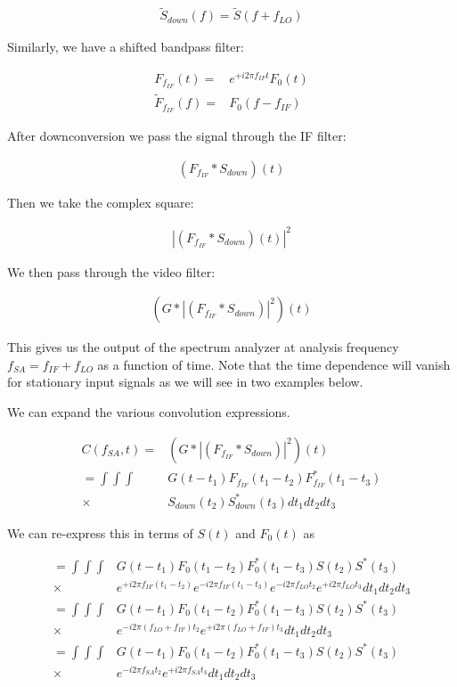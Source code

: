 \documentclass[12pt]{article}
\begin{document}
\begin{align}
\tilde{S}_{down}(f) = \tilde{S}(f + f_{LO})
\end{align}

Similarly, we have a shifted bandpass filter:

\begin{align}
F_{f_{IF}}(t) =& e^{+i2\pi f_{IF} t} F_0(t)\\
\tilde{F}_{f_{IF}}(f) =& F_0(f-f_{IF})
\end{align}

After downconversion we pass the signal through the IF filter:

\begin{align}
\left(F_{f_{IF}} \ast S_{down}\right)(t)
\end{align}

Then we take the complex square:

\begin{align}
\left|\left(F_{f_{IF}} \ast S_{down}\right)(t)\right|^2
\end{align}

We then pass through the video filter:

\begin{align}
\left(G \ast \left|\left(F_{f_{IF}} \ast S_{down}\right)\right|^2\right)(t)
\end{align}

This gives us the output of the spectrum analyzer at analysis frequency $f_{SA} = f_{IF} + f_{LO}$ as a function of time.
Note that the time dependence will vanish for stationary input signals as we will see in two examples below.

We can expand the various convolution expressions.

\begin{align}
C(f_{SA}, t) =& \left(G \ast \left|\left(F_{f_{IF}} \ast S_{down}\right)\right|^2\right)(t)\\
= \int \int \int &G(t-t_1) F_{f_{IF}}(t_1-t_2)F^*_{f_{IF}}(t_1-t_3)\\
\times& S_{down}(t_2)S_{down}^*(t_3) dt_1 dt_2 dt_3
\end{align}

We can re-express this in terms of $S(t)$ and $F_0(t)$ as

\begin{align}
=\int \int \int &G(t-t_1)F_0(t_1-t_2)F_0^*(t_1-t_3)S(t_2)S^*(t_3)\\
\times& e^{+i2\pi f_{IF}(t_1 - t_2)} e^{-i2\pi f_{IF}(t_1-t_3)} e^{-i2\pi f_{LO}t_2}e^{+i2\pi f_{LO}t_3} dt_1dt_2dt_3\\
=\int \int \int &G(t-t_1)F_0(t_1-t_2)F_0^*(t_1-t_3)S(t_2)S^*(t_3)\\
\times& e^{-i2\pi (f_{LO}+f_{IF})t_2} e^{+i2\pi (f_{LO}+f_{IF})t_3} dt_1 dt_2 dt_3\\
=\int \int \int &G(t-t_1)F_0(t_1-t_2)F_0^*(t_1-t_3)S(t_2)S^*(t_3)\\
\times& e^{-i2\pi f_{SA} t_2} e^{+i2\pi f_{SA}t_3} dt_1 dt_2 dt_3\\
\end{align}
\end{document}
